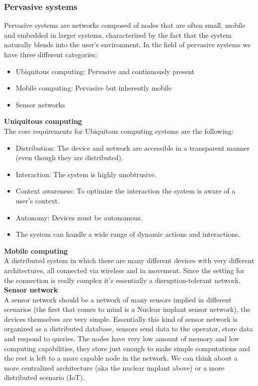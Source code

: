 \subsubsection{Pervasive systems}
Pervasive systems are networks composed of nodes that are often small, mobile and embedded in larger systems, characterized by the fact that the system naturally blends into the user's environment. In the field of pervasive systems we have three different categories:
\begin{itemize}
    \item Ubiquitous computing: Pervasive and continuously present
    \item Mobile computing: Pervasive but inherently mobile
    \item Sensor networks
\end{itemize}
\textbf{Uniquitous computing} \\
The core requirements for Ubiquitous computing systems are the following:
\begin{itemize}
    \item Distribution: The device and network are accessible in a transparent manner (even though they are distributed).
    \item Interaction: The system is highly unobtrusive.
    \item Context awareness: To optimize the interaction the system is aware of a user's context.
    \item Autonomy: Devices must be autonomous.
    \item The system can handle a wide range of dynamic actions and interactions.
\end{itemize}
\textbf{Mobile computing} \\
A distributed system in which there are many different devices with very different architectures, all connected via wireless and in movement. Since the setting for the connection is really complex it's essentially a disruption-tolerant network. \\
\textbf{Sensor network} \\
A sensor network should be a network of many sensors implied in different scenarios (the first that comes to mind is a Nuclear implant sensor network), the devices themselves are very simple. Essentially this kind of sensor network is organized as a distributed database, sensors send data to the operator, store data and respond to queries.
The nodes have very low amount of memory and low computing capabilities, they store just enough to make simple computations and the rest is left to a more capable node in the network. We can think about a more centralized architecture (aka the nuclear implant above) or a more distributed scenario (IoT).